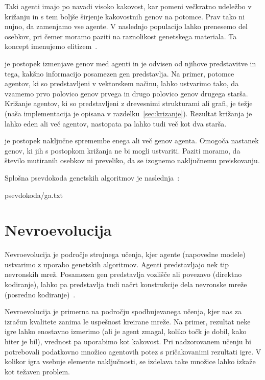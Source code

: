 \documentclass[a4paper,12pt,openright]{book}
\newcommand{\lstlistingslo}{}
\begin{document}
\begin{description}
{            Taki agenti imajo po navadi visoko kakovost, kar pomeni večkratno udeležbo v križanju in s tem boljše širjenje kakovostnih genov na potomce.
            Prav tako ni nujno, da zamenjamo vse agente. V naslednjo populacijo lahko prenesemo del osebkov, pri
            čemer moramo paziti na raznolikost genetskega materiala. Ta koncept imenujemo elitizem~\cite{inteligentni_sistemi_2010}.
            \item}
        \item[Križanje]{je postopek izmenjave genov med agenti in je odvisen od njihove predstavitve in tega, kakšno informacijo posamezen gen predstavlja.
            Na primer, potomce agentov, ki so predstavljeni v vektorskem načinu, lahko ustvarimo tako, da vzamemo prvo polovico genov prvega in drugo polovico genov
            drugega starša. Križanje agentov, ki so predstavljeni z drevesnimi strukturami ali grafi, je težje
            (naša implementacija je opisana v razdelku~\ref{sec:krizanje}).
            Rezultat križanja je lahko eden ali več agentov, nastopata pa lahko tudi več kot dva starša. }
        \item[Mutacija]{je postopek naključne spremembe enega ali več genov agenta. Omogoča nastanek genov, ki jih
            s postopkom križanja ne bi mogli ustvariti. Paziti moramo, da število mutiranih osebkov ni preveliko,
            da se izognemo naključnemu preiskovanju.}
    \end{description}

    Splošna psevdokoda genetskih algoritmov je naslednja~\cite{inteligentni_sistemi_2010}:

    \lstlistingslo{psevdokoda/ga.txt}


    \section{Nevroevolucija}\label{sec:nevroevolucija}
    Nevroevolucija je področje strojnega učenja, kjer agente (napovedne modele) ustvarimo z uporabo genetskih algoritmov.
    Agenti predstavljajo nek tip nevronskih mrež.
    Posamezen gen predstavlja vozlišče ali povezavo (direktno kodiranje), lahko pa
    predstavlja tudi načrt konstrukcije dela nevronske mreže (posredno kodiranje)~\cite{kassahun2007common}.

    Nevroevolucija je primerna na področju spodbujevanega učenja, kjer nas za izračun kvalitete zanima le uspešnost
    kreirane mreže.
    Na primer, rezultat neke igre lahko enostavno izmerimo (ali je agent zmagal, koliko točk je dobil, kako hiter je bil),
    vrednost pa uporabimo kot kakovost.
    Pri nadzorovanem učenju bi potrebovali podatkovno množico agentovih potez s pričakovanimi rezultati igre.
    V kolikor igra vsebuje elemente naključnosti, se izdelava take množice lahko izkaže kot težaven problem.
\end{document}
